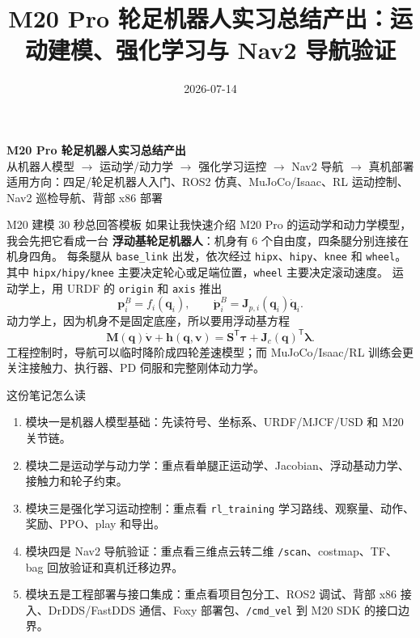 \documentclass[UTF8,11pt,a4paper]{ctexart}
\title{M20 Pro 轮足机器人实习总结产出：运动建模、强化学习与 Nav2 导航验证}
\author{}
\date{2026-07-14}
\newcommand{\T}{^{\mathsf T}}
\newcommand{\bs}[1]{\bm{#1}}
\begin{document}
\begin{center}
    {\Huge\bfseries\textcolor{mainblue}{M20 Pro 轮足机器人实习总结产出}}\\[0.4em]
    {\large 从机器人模型 $\rightarrow$ 运动学/动力学 $\rightarrow$ 强化学习运控 $\rightarrow$ Nav2 导航 $\rightarrow$ 真机部署}\\[0.3em]
    {\normalsize 适用方向：四足/轮足机器人入门、ROS2 仿真、MuJoCo/Isaac、RL 运动控制、Nav2 巡检导航、背部 x86 部署}\vspace{0.8em}
\end{center}

\begin{orangebox}{M20 建模 30 秒总回答模板}
如果让我快速介绍 M20 Pro 的运动学和动力学模型，我会先把它看成一台
\textbf{浮动基轮足机器人}：机身有 6 个自由度，四条腿分别连接在机身四角。
每条腿从 \texttt{base\_link} 出发，依次经过 \texttt{hipx}、\texttt{hipy}、\texttt{knee} 和 \texttt{wheel}。
其中 \texttt{hipx/hipy/knee} 主要决定轮心或足端位置，\texttt{wheel} 主要决定滚动速度。
运动学上，用 URDF 的 \texttt{origin} 和 \texttt{axis} 推出
\[
\bs p_i^B=f_i(\bs q_i),\qquad
\dot{\bs p}_i^B=\bs J_{p,i}(\bs q_i)\dot{\bs q}_i.
\]
动力学上，因为机身不是固定底座，所以要用浮动基方程
\[
\bs M(\bs q)\dot{\bs v}+\bs h(\bs q,\bs v)
=
\bs S\T\bs\tau+\bs J_c(\bs q)\T\bs\lambda.
\]
工程控制时，导航可以临时降阶成四轮差速模型；而 MuJoCo/Isaac/RL 训练会更关注接触力、执行器、PD 伺服和完整刚体动力学。
\end{orangebox}

\begin{greenbox}{这份笔记怎么读}
\begin{enumerate}
    \item 模块一是机器人模型基础：先读符号、坐标系、URDF/MJCF/USD 和 M20 关节链。
    \item 模块二是运动学与动力学：重点看单腿正运动学、Jacobian、浮动基动力学、接触力和轮子约束。
    \item 模块三是强化学习运动控制：重点看 \texttt{rl\_training} 学习路线、观察量、动作、奖励、PPO、play 和导出。
    \item 模块四是 Nav2 导航验证：重点看三维点云转二维 \texttt{/scan}、costmap、TF、bag 回放验证和真机迁移边界。
    \item 模块五是工程部署与接口集成：重点看项目包分工、ROS2 调试、背部 x86 接入、DrDDS/FastDDS 通信、Foxy 部署包、\texttt{/cmd\_vel} 到 M20 SDK 的接口边界。
\end{enumerate}
\end{greenbox}
\end{document}
